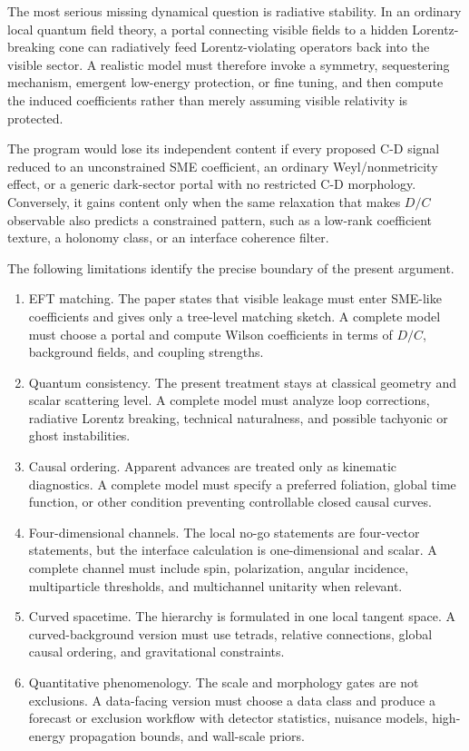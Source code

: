 \documentclass[11pt]{article}
\begin{document}
The most serious missing dynamical question is radiative stability. In an ordinary local quantum field theory, a portal connecting visible fields to a hidden Lorentz-breaking cone can radiatively feed Lorentz-violating operators back into the visible sector. A realistic model must therefore invoke a symmetry, sequestering mechanism, emergent low-energy protection, or fine tuning, and then compute the induced coefficients rather than merely assuming visible relativity is protected.


The program would lose its independent content if every proposed C-D signal reduced to an unconstrained SME coefficient, an ordinary Weyl/nonmetricity effect, or a generic dark-sector portal with no restricted C-D morphology. Conversely, it gains content only when the same relaxation that makes \(D/C\) observable also predicts a constrained pattern, such as a low-rank coefficient texture, a holonomy class, or an interface coherence filter.


The following limitations identify the precise boundary of the present argument.


\begin{enumerate}
\item EFT matching. The paper states that visible leakage must enter SME-like coefficients and gives only a tree-level matching sketch. A complete model must choose a portal and compute Wilson coefficients in terms of \(D/C\), background fields, and coupling strengths.
\item Quantum consistency. The present treatment stays at classical geometry and scalar scattering level. A complete model must analyze loop corrections, radiative Lorentz breaking, technical naturalness, and possible tachyonic or ghost instabilities.
\item Causal ordering. Apparent advances are treated only as kinematic diagnostics. A complete model must specify a preferred foliation, global time function, or other condition preventing controllable closed causal curves.
\item Four-dimensional channels. The local no-go statements are four-vector statements, but the interface calculation is one-dimensional and scalar. A complete channel must include spin, polarization, angular incidence, multiparticle thresholds, and multichannel unitarity when relevant.
\item Curved spacetime. The hierarchy is formulated in one local tangent space. A curved-background version must use tetrads, relative connections, global causal ordering, and gravitational constraints.
\item Quantitative phenomenology. The scale and morphology gates are not exclusions. A data-facing version must choose a data class and produce a forecast or exclusion workflow with detector statistics, nuisance models, high-energy propagation bounds, and wall-scale priors.
\end{enumerate}
\end{document}
